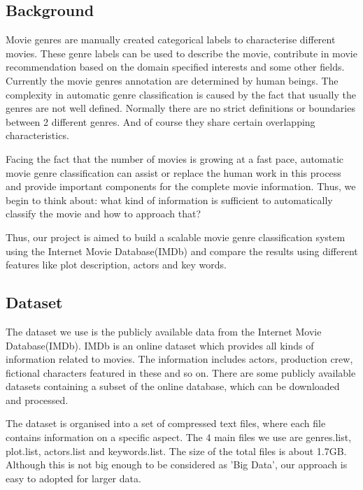 \documentclass{vldb}
\begin{document}
\subsection{Background}
Movie genres are manually created categorical labels to characterise different movies. These genre labels can be used to describe the movie, contribute in movie recommendation based on the domain specified interests and some other fields. Currently the movie genres annotation are determined by human beings. The complexity in automatic genre classification is caused by the fact that usually the genres are not well  defined. Normally there are no strict definitions or boundaries between 2 different genres.  And of course they share certain overlapping characteristics.
\par Facing the fact that the number of movies is growing at a fast pace, automatic movie genre classification can assist or replace the human work in this process and provide important components for the complete movie information. Thus, we begin to think about: what kind of information is sufficient to automatically classify the movie and how to approach that?
\par Thus, our project is aimed to build a scalable movie genre classification system using the Internet Movie Database(IMDb) and compare the results using different features like plot description, actors and key words. 

\subsection{Dataset} 
The dataset we use is the publicly available data from the Internet Movie Database(IMDb). IMDb is an online dataset which provides all kinds of information related to movies. The information includes actors, production crew, fictional characters featured in these and so on. There are some publicly available datasets containing a subset of the online database, which can be downloaded and processed. 
\par The dataset is organised into a set of compressed text files, where each file contains information on a specific aspect. The 4 main files we use are genres.list, plot.list, actors.list and keywords.list. The size of the total files is about 1.7GB. Although this is not big enough to be considered as 'Big Data', our approach is easy to adopted for larger data.
\end{document}

